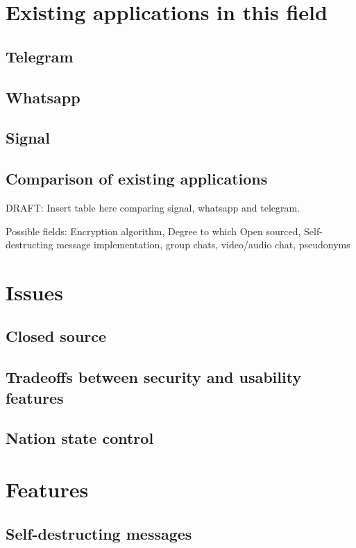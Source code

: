 \documentclass{mproj}
\begin{document}
\section{Existing applications in this field}
\subsection{Telegram}

\subsection{Whatsapp}

\subsection{Signal}

\subsection{Comparison of existing applications}
DRAFT: Insert table here comparing signal, whatsapp and telegram. 

Possible fields: Encryption algorithm, Degree to which Open sourced, Self-destructing message implementation, group chats, video/audio chat, pseudonyms  

\section{Issues}

\subsection{Closed source}

\subsection{Tradeoffs between security and usability features}

\subsection{Nation state control}


\section{Features}
\subsection{Self-destructing messages}
\end{document}
